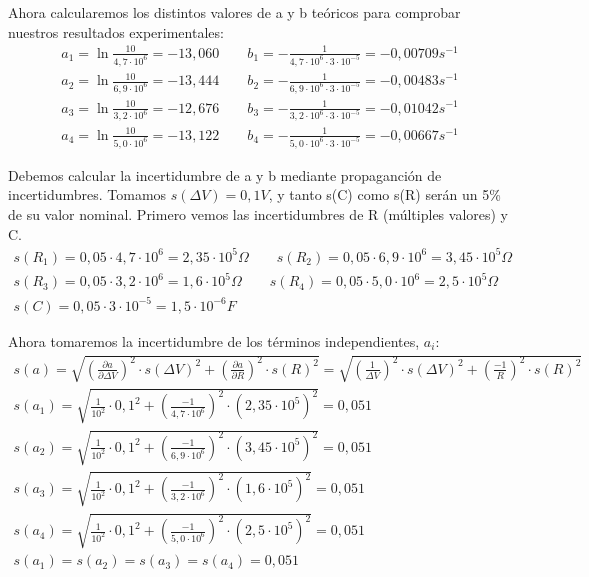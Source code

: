\documentclass[12pt, a4paper, titlepage]{article}
\begin{document}
  Ahora calcularemos los distintos valores de a y b teóricos para comprobar nuestros resultados experimentales:
  \begin{gather*}
    a_1 = \ln{\frac{10}{4,7 \cdot 10^6}} = -13,060 \qquad b_1 = - \frac{1}{4,7 \cdot 10^6 \cdot 3 \cdot 10^{-5}} = -0,00709 s^{-1} \\
    a_2 = \ln{\frac{10}{6,9 \cdot 10^6}} = -13,444 \qquad b_2 = - \frac{1}{6,9 \cdot 10^6 \cdot 3 \cdot 10^{-5}} = -0,00483 s^{-1} \\
    a_3 = \ln{\frac{10}{3,2 \cdot 10^6}} = -12,676 \qquad b_3 = - \frac{1}{3,2 \cdot 10^6 \cdot 3 \cdot 10^{-5}} = -0,01042 s^{-1} \\
    a_4 = \ln{\frac{10}{5,0 \cdot 10^6}} = -13,122 \qquad b_4 = - \frac{1}{5,0 \cdot 10^6 \cdot 3 \cdot 10^{-5}} = -0,00667 s^{-1}
  \end{gather*}

  Debemos calcular la incertidumbre de a y b mediante propaganción de incertidumbres. Tomamos $s(\Delta V) = 0,1V$, y tanto s(C) como s(R) serán un 5\% de su valor nominal. Primero vemos las incertidumbres de R (múltiples valores) y C.
  \begin{gather}
    s(R_1) = 0,05 \cdot 4,7 \cdot 10^6 = 2,35 \cdot 10^5 \Omega \qquad s(R_2) = 0,05 \cdot 6,9 \cdot 10^6 = 3,45 \cdot 10^5 \Omega \nonumber \\
    s(R_3) = 0,05 \cdot 3,2 \cdot 10^6 = 1,6 \cdot 10^5 \Omega \qquad s(R_4) = 0,05 \cdot 5,0 \cdot 10^6 = 2,5 \cdot 10^5 \Omega \nonumber \\
    s(C) = 0,05 \cdot 3 \cdot 10^{-5} = 1,5 \cdot 10^{-6} F \nonumber
  \end{gather}

  Ahora tomaremos la incertidumbre de los términos independientes, $a_i$:
  \begin{gather}
    s(a) = \sqrt{\left(\frac{\partial a}{\partial \Delta V}\right)^2 \cdot s(\Delta V)^2 + \left(\frac{\partial a}{\partial R}\right)^2 \cdot s(R)^2} = \sqrt{\left(\frac{1}{\Delta V}\right)^2 \cdot s(\Delta V)^2 + \left(\frac{-1}{R}\right)^2 \cdot s(R)^2} \\
    s(a_1) = \sqrt{\frac{1}{10^2} \cdot 0,1^2 + \left(\frac{-1}{4,7 \cdot 10^6}\right)^2 \cdot (2,35 \cdot 10^5)^2} = 0,051 \nonumber \\
    s(a_2) = \sqrt{\frac{1}{10^2} \cdot 0,1^2 + \left(\frac{-1}{6,9 \cdot 10^6}\right)^2 \cdot (3,45 \cdot 10^5)^2} = 0,051 \nonumber \\
    s(a_3) = \sqrt{\frac{1}{10^2} \cdot 0,1^2 + \left(\frac{-1}{3,2 \cdot 10^6}\right)^2 \cdot (1,6 \cdot 10^5)^2} = 0,051 \nonumber \\
    s(a_4) = \sqrt{\frac{1}{10^2} \cdot 0,1^2 + \left(\frac{-1}{5,0 \cdot 10^6}\right)^2 \cdot (2,5 \cdot 10^5)^2} = 0,051 \nonumber \\
    s(a_1) = s(a_2) = s(a_3) = s(a_4) = 0,051 \nonumber
  \end{gather}
\end{document}
